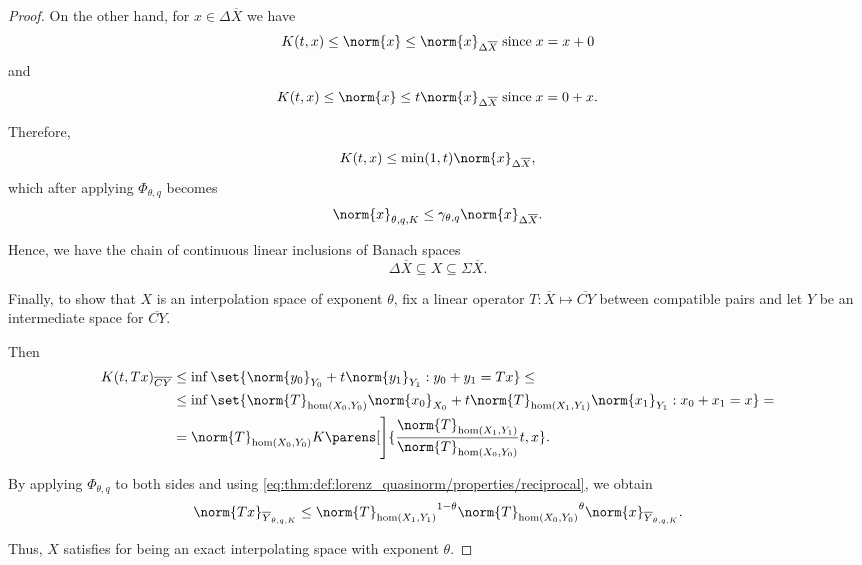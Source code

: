 \begin{proof}
  On the other hand, for \( x \in \Delta \overline{X} \) we have
  \begin{equation*}
    K(t, x) \leq \norm{x} \leq \norm{x}_{\Delta \overline{X}} \T{since} x = x + 0
  \end{equation*}
  and
  \begin{equation*}
    K(t, x) \leq \norm{x} \leq t \norm{x}_{\Delta \overline{X}} \T{since} x = 0 + x.
  \end{equation*}

  Therefore,
  \begin{equation*}
    K(t, x) \leq \min(1, t) \norm{x}_{\Delta \overline{X}},
  \end{equation*}
  which after applying \( \Phi_{\theta,q} \) becomes
  \begin{equation*}
    \norm{x}_{\theta,q,K} \leq \gamma_{\theta,q} \norm{x}_{\Delta \overline{X}}.
  \end{equation*}

  Hence, we have the chain of continuous linear inclusions of Banach spaces
  \begin{equation*}
    \Delta \overline{X} \subseteq X \subseteq \Sigma \overline{X}.
  \end{equation*}

  Finally, to show that \( X \) is an interpolation space of exponent \( \theta \), fix a linear operator \( T: \overline{X} \mapsto \overline{CY} \) between compatible pairs and let \( Y \) be an intermediate space for \( \overline{CY} \).

  Then
  \begin{align*}
    K(t, Tx)_{\overline{CY}}
    &\leq
    \inf \set{ \norm{y_0}_{Y_0} + t \norm{y_1}_{Y_1} : y_0 + y_1 = Tx }
    \leq \\ &\leq
    \inf \set{ \norm{T}_{\hom(X_0, Y_0)} \norm{x_0}_{X_0} + t \norm{T}_{\hom(X_1, Y_1)} \norm{x_1}_{Y_1} : x_0 + x_1 = x }
    = \\ &=
    \norm{T}_{\hom(X_0, Y_0)} K\parens[\Bigg]{\frac {\norm{T}_{\hom(X_1, Y_1)}} {\norm{T}_{\hom(X_0, Y_0)}} t, x}.
  \end{align*}

  By applying \( \Phi_{\theta,q} \) to both sides and using \eqref{eq:thm:def:lorenz_quasinorm/properties/reciprocal}, we obtain
  \begin{equation*}
    \norm{Tx}_{\overline{Y}_{\theta,q,K}}
    \leq
    {\norm{T}_{\hom(X_1, Y_1)}}^{1 - \theta} {\norm{T}_{\hom(X_0, Y_0)}}^{\theta} \norm{x}_{\overline{Y}_{\theta,q,K}}.
  \end{equation*}

  Thus, \( X \) satisfies  for being an exact interpolating space with exponent \( \theta \).
\end{proof}

